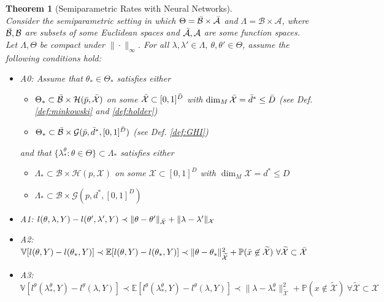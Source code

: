 \documentclass[12pt]{article}
\theoremstyle{myplain}
\newtheorem{theorem}{Theorem}[section]
\theoremstyle{definition}
\theoremstyle{definition}
\theoremstyle{remark}
\numberwithin{equation}{section}
\begin{document}
\begin{theorem}[Semiparametric Rates with Neural Networks]\label{thm:neuralArate} \ \\
Consider the semiparametric setting in which $\Theta=\Bar{\mathcal{B}}\times\Bar{\mathcal{A}}$ and $\Lambda=\mathcal{B}\times\mathcal{A}$, where $\Bar{\mathcal{B}},\mathcal{B}$ are subsets of some Euclidean spaces and $\Bar{\mathcal{A}}, \mathcal{A}$ are some function spaces. Let $\Lambda, \Theta$ be compact under $\|\cdot\|_\infty$. For all $\lambda,\lambda'\in\Lambda,\ \theta,\theta'\in\Theta$, assume the following conditions hold:
\begin{itemize}[leftmargin=*]
    \item A0: Assume that $\theta_*\in \Theta_*$ satisfies either\begin{itemize}
        \item[a)] $\Theta_*\subset\Bar{\mathcal{B}}\times\mathcal{H}(\Bar p, \Bar {\mathcal{X}})$ on some $ \Bar {\mathcal{X}}\subset[0,1]^{\Bar D}$ with $\operatorname{dim}_M \Bar {\mathcal{X}} = \Bar d^* \leq \Bar D $ (see Def. \ref{def:minkowski} and \ref{def:holder})
        \item[b)] $\Theta_*\subset\Bar{\mathcal{B}}\times\mathcal{G}( \Bar p ,\Bar d^* , [0, 1]^{\Bar D })$ (see Def. \ref{def:GHI}) 
    \end{itemize}
    and that $\{\lambda_*^\theta : \theta\in\Theta\}\subset\Lambda_*$ satisfies either \begin{itemize}
        \item[a)] $\Lambda_*\subset\mathcal{B}\times\mathcal{H}(p , {\mathcal{X}} )$ on some ${\mathcal{X}} \subset[0,1]^{D }$ with $\operatorname{dim}_M {\mathcal{X}}  = d^* \leq D $ 
        \item[b)] $\Lambda_*\subset\mathcal{B}\times\mathcal{G}(p , d^* , [0, 1]^{D })$ 
    \end{itemize}
    \item A1: $l(\theta, \lambda, Y)-l(\theta', \lambda', Y) \prec \|\theta-\theta' \|_{\Bar {\mathcal{X}} } + \|\lambda-\lambda'\|_{{\mathcal{X}} }$
    \item A2:  $\mathbb{V}[l(\theta, Y)-l(\theta_*, Y)] \prec \mathbb{E}[l(\theta, Y)-l(\theta_*, Y)] \prec \|\theta-\theta_*\|^{2}_{\widetilde{{\mathcal{X}}}} + \mathbb{P}(\Bar x\not\in\widetilde{{\mathcal{X}}}) \ \forall \widetilde{{\mathcal{X}}}\subset\Bar {\mathcal{X}}$
    \item A3: $\mathbb{V}[l^\theta(\lambda_*^\theta, Y)-l^\theta(\lambda, Y)] \prec \mathbb{E}[l^\theta(\lambda_*^\theta, Y)-l^\theta(\lambda, Y)]\prec \|\lambda-\lambda_*^\theta\|^{2}_{\widetilde{{\mathcal{X}}}} + \mathbb{P}(x\not\in \widetilde{\mathcal{X}}) \ \forall \widetilde{{\mathcal{X}}}\subset {\mathcal{X}}$

\end{itemize}
\end{theorem}
\end{document}

